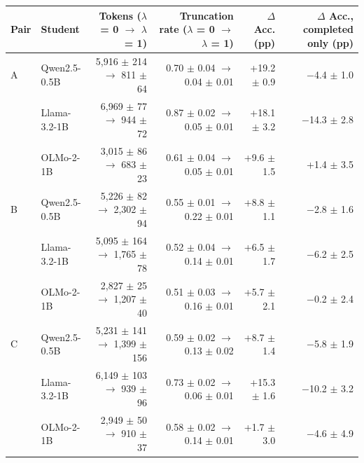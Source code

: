 \begin{tabular}{llrrrr}
\toprule
Pair & Student & Tokens ($\lambda$ = 0 $\rightarrow$ $\lambda$ = 1) & Truncation rate ($\lambda$ = 0 $\rightarrow$ $\lambda$ = 1) & $\Delta$ Acc. (pp) & $\Delta$ Acc., completed only (pp) \\
\midrule
A & Qwen2.5-0.5B & 5,916 $\pm$ 214 $\rightarrow$ 811 $\pm$ 64 & 0.70 $\pm$ 0.04 $\rightarrow$ 0.04 $\pm$ 0.01 & +19.2 $\pm$ 0.9 & $-$4.4 $\pm$ 1.0 \\
 & Llama-3.2-1B & 6,969 $\pm$ 77 $\rightarrow$ 944 $\pm$ 72 & 0.87 $\pm$ 0.02 $\rightarrow$ 0.05 $\pm$ 0.01 & +18.1 $\pm$ 3.2 & $-$14.3 $\pm$ 2.8 \\
 & OLMo-2-1B & 3,015 $\pm$ 86 $\rightarrow$ 683 $\pm$ 23 & 0.61 $\pm$ 0.04 $\rightarrow$ 0.05 $\pm$ 0.01 & +9.6 $\pm$ 1.5 & +1.4 $\pm$ 3.5 \\
\midrule
B & Qwen2.5-0.5B & 5,226 $\pm$ 82 $\rightarrow$ 2,302 $\pm$ 94 & 0.55 $\pm$ 0.01 $\rightarrow$ 0.22 $\pm$ 0.01 & +8.8 $\pm$ 1.1 & $-$2.8 $\pm$ 1.6 \\
 & Llama-3.2-1B & 5,095 $\pm$ 164 $\rightarrow$ 1,765 $\pm$ 78 & 0.52 $\pm$ 0.04 $\rightarrow$ 0.14 $\pm$ 0.01 & +6.5 $\pm$ 1.7 & $-$6.2 $\pm$ 2.5 \\
 & OLMo-2-1B & 2,827 $\pm$ 25 $\rightarrow$ 1,207 $\pm$ 40 & 0.51 $\pm$ 0.03 $\rightarrow$ 0.16 $\pm$ 0.01 & +5.7 $\pm$ 2.1 & $-$0.2 $\pm$ 2.4 \\
\midrule
C & Qwen2.5-0.5B & 5,231 $\pm$ 141 $\rightarrow$ 1,399 $\pm$ 156 & 0.59 $\pm$ 0.02 $\rightarrow$ 0.13 $\pm$ 0.02 & +8.7 $\pm$ 1.4 & $-$5.8 $\pm$ 1.9 \\
 & Llama-3.2-1B & 6,149 $\pm$ 103 $\rightarrow$ 939 $\pm$ 96 & 0.73 $\pm$ 0.02 $\rightarrow$ 0.06 $\pm$ 0.01 & +15.3 $\pm$ 1.6 & $-$10.2 $\pm$ 3.2 \\
 & OLMo-2-1B & 2,949 $\pm$ 50 $\rightarrow$ 910 $\pm$ 37 & 0.58 $\pm$ 0.02 $\rightarrow$ 0.14 $\pm$ 0.01 & +1.7 $\pm$ 3.0 & $-$4.6 $\pm$ 4.9 \\
\bottomrule
\end{tabular}
